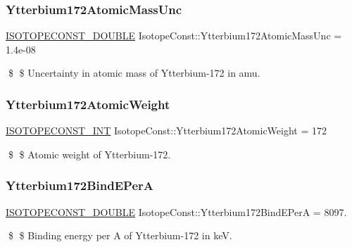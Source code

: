\subsubsection{\texorpdfstring{Ytterbium172\+Atomic\+Mass\+Unc}{Ytterbium172AtomicMassUnc}}
{\footnotesize\ttfamily \mbox{\hyperlink{group___isotope_const-_macros_ga8f45a7272ce02c0b4c65c44636ed719a}{I\+S\+O\+T\+O\+P\+E\+C\+O\+N\+S\+T\+\_\+\+D\+O\+U\+B\+LE}} Isotope\+Const\+::\+Ytterbium172\+Atomic\+Mass\+Unc = 1.\+4e-\/08}

\$ \$ Uncertainty in atomic mass of Ytterbium-\/172 in amu. \mbox{\label{group___isotope_const-_ytterbium-_yb172_ga973e03ef26965dad56237fe7deeeaede}} 
\subsubsection{\texorpdfstring{Ytterbium172\+Atomic\+Weight}{Ytterbium172AtomicWeight}}
{\footnotesize\ttfamily \mbox{\hyperlink{group___isotope_const-_macros_ga5f18360b3e99483a35c32d789e62621c}{I\+S\+O\+T\+O\+P\+E\+C\+O\+N\+S\+T\+\_\+\+I\+NT}} Isotope\+Const\+::\+Ytterbium172\+Atomic\+Weight = 172}

\$ \$ Atomic weight of Ytterbium-\/172. \mbox{\label{group___isotope_const-_ytterbium-_yb172_ga77b8e61d7d7f13ca9fffdbf8fa663f31}} 
\subsubsection{\texorpdfstring{Ytterbium172\+Bind\+E\+PerA}{Ytterbium172BindEPerA}}
{\footnotesize\ttfamily \mbox{\hyperlink{group___isotope_const-_macros_ga8f45a7272ce02c0b4c65c44636ed719a}{I\+S\+O\+T\+O\+P\+E\+C\+O\+N\+S\+T\+\_\+\+D\+O\+U\+B\+LE}} Isotope\+Const\+::\+Ytterbium172\+Bind\+E\+PerA = 8097.}

\$ \$ Binding energy per A of Ytterbium-\/172 in keV. \mbox{\label{group___isotope_const-_ytterbium-_yb172_gab72bc59e2b1f99a135b48a0eb34e272c}} 
